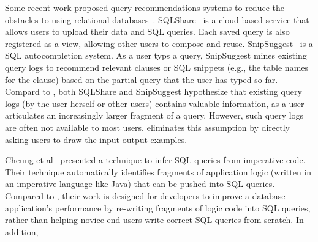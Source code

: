 

Some recent work proposed query recommendations systems to reduce
the obstacles to using relational databases~\cite{Howe:2011, Khoussainova:2010}. 
SQLShare~\cite{Howe:2011} is a cloud-based service that allows
users to upload their data and SQL queries. 
Each saved query is also registered as a view, allowing other users
to compose and reuse. SnipSuggest~\cite{Khoussainova:2010} is a SQL autocompletion
system. As a user typs a query, SnipSuggest mines existing query
logs to recommend relevant clauses or SQL snippets (e.g., the table
names for the  clause) based on the partial query that
the user has typed so far.
Compard to \ourtool, both SQLShare and SnipSuggest hypothesize that existing query
logs (by the user herself or other users) contains valuable information,
as a user articulates an increasingly larger fragment of a query.
However, such query logs are often not available to most users.
\ourtool eliminates this assumption by directly asking users to
draw the input-output examples.


Cheung et al~\cite{abs-1208-2013} presented a technique to infer SQL
queries from imperative code. Their technique automatically identifies
fragments of application logic (written in an imperative language
like Java) that can be pushed into SQL queries. 
Compared to \ourtool, their work is designed for developers
to improve a database application's performance by re-writing fragments of
logic code into SQL queries, rather than helping novice end-users
write correct SQL queries from scratch. In addition,

